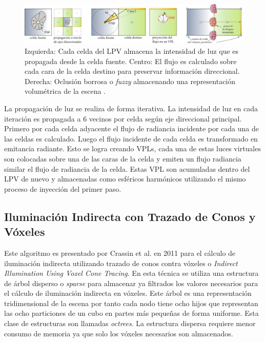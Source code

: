 \begin{figure}[H]
	\centering
	\includegraphics[width=\linewidth]{media/lpv_explain.png}
	\caption{Izquierda: Cada celda del \ac{LPV} almacena la intensidad de luz que es propagada desde la celda fuente. Centro: El flujo es calculado sobre cada cara de la celda destino para preservar información direccional. Derecha: Oclusión borrosa o \emph{fuzzy} almacenando una representación volumétrica de la escena \cite{Kaplanyan:2010}.}
	\label{fig:lpv_explain}
\end{figure}

La propagación de luz se realiza de forma iterativa. La intensidad de luz en cada iteración es propagada a 6 vecinos por celda según eje direccional principal. Primero por cada celda adyacente el flujo de radiancia incidente por cada una de las celdas es calculado. Luego el flujo incidente de cada celda es transformado en emitancia radiante. Esto se logra creando \ac{VPL}s, cada una de estas luces virtuales son colocadas sobre una de las caras de la celda y emiten un flujo radiancia similar el flujo de radiancia de la celda. Estas \ac{VPL} son acumuladas dentro del \ac{LPV} de nuevo y almacenadas como esféricos harmónicos utilizando el mismo proceso de inyección del primer paso. 

\subsection{Iluminación Indirecta con Trazado de Conos y Vóxeles}
\label{sub:voxel_cone_tracing_orig}
Este algoritmo es presentado por Crassin et al. en 2011 \cite{CNSGE11b} para el cálculo de iluminación indirecta utilizando trazado de conos contra vóxeles o \emph{Indirect Illumination Using Voxel Cone Tracing}. En esta técnica se utiliza una estructura de árbol disperso o \emph{sparse} para almacenar ya filtrados los valores necesarios para el cálculo de iluminación indirecta en vóxeles. Este árbol es una representación tridimensional de la escena por tanto cada nodo tiene ocho hijos que representan las ocho particiones de un cubo en partes más pequeñas de forma uniforme. Esta clase de estructuras son llamadas \emph{octrees}. La estructura dispersa requiere menor consumo de memoria ya que solo los vóxeles necesarios son almacenados.

